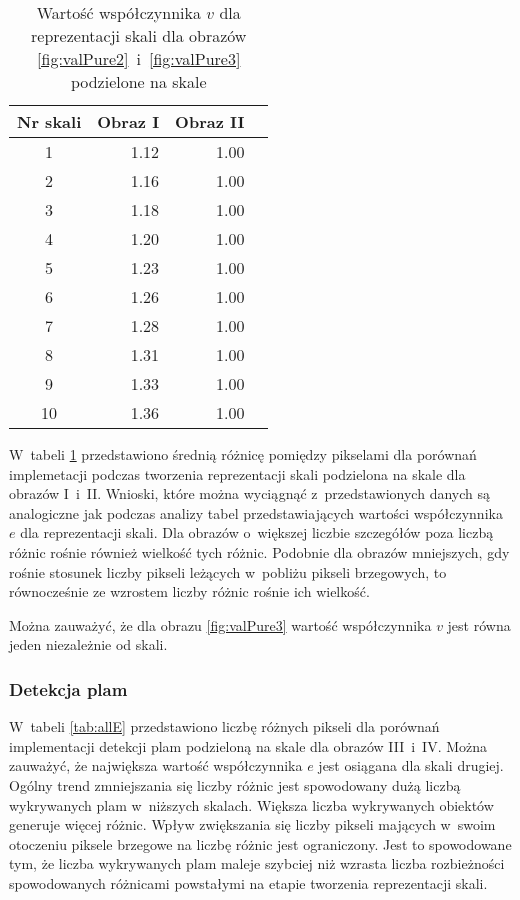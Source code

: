 \begin{center}
\begin{table}
\centering
\caption{Wartość współczynnika $ v $ dla reprezentacji skali dla obrazów \ref{fig:valPure2}~i~\ref{fig:valPure3} podzielone na skale}
\label{tab:allV}
\begin{tabular}{|c|r|r|r|}
\hline
Nr skali & Obraz I  &  Obraz II\\ \hline
1        & 1.12     & 1.00\\ \hline
2        & 1.16     & 1.00\\ \hline
3        & 1.18     & 1.00\\ \hline
4        & 1.20     & 1.00\\ \hline
5        & 1.23     & 1.00\\ \hline
6        & 1.26     & 1.00\\ \hline
7        & 1.28     & 1.00\\ \hline
8        & 1.31     & 1.00\\ \hline
9        & 1.33     & 1.00\\ \hline
10       & 1.36     & 1.00\\ \hline
\end{tabular}
\end{table}
\end{center}

W~tabeli \ref{tab:allV} przedstawiono średnią różnicę pomiędzy pikselami dla porównań implemetacji podczas tworzenia reprezentacji skali podzielona na skale dla obrazów I~i~II. Wnioski, które można wyciągnąć z~przedstawionych danych są analogiczne jak podczas analizy tabel przedstawiających wartości współczynnika $ e $ dla reprezentacji skali. Dla obrazów o~większej liczbie szczegółów poza liczbą różnic rośnie również wielkość tych różnic. Podobnie dla obrazów mniejszych, gdy rośnie stosunek liczby pikseli leżących w~pobliżu pikseli brzegowych, to równocześnie ze wzrostem liczby różnic rośnie ich wielkość.

Można zauważyć, że dla obrazu \ref{fig:valPure3} wartość współczynnika $ v $ jest równa jeden niezależnie od skali.

\subsubsection{Detekcja plam}
\label{subsubsec:plamyTabele}

W~tabeli \ref{tab:allE} przedstawiono liczbę różnych pikseli dla porównań implementacji detekcji plam podzieloną na skale dla obrazów III~i~IV. Można zauważyć, że największa wartość współczynnika $ e $ jest osiągana dla skali drugiej. Ogólny trend zmniejszania się liczby różnic jest spowodowany dużą liczbą wykrywanych plam w~niższych skalach. Większa liczba wykrywanych obiektów generuje więcej różnic. Wpływ zwiększania się liczby pikseli mających w~swoim otoczeniu piksele brzegowe na liczbę różnic jest ograniczony. Jest to spowodowane tym, że liczba wykrywanych plam maleje szybciej niż wzrasta liczba rozbieżności spowodowanych różnicami powstałymi na etapie tworzenia reprezentacji skali.

